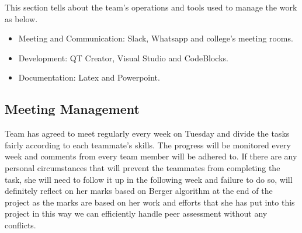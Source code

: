 \documentclass{article}
\begin{document}
This section tells about the team's operations and tools used to manage the work as below.   
\begin{itemize}

\item Meeting and Communication: Slack, Whatsapp and college's meeting rooms.
\item Development: QT Creator, Visual Studio and CodeBlocks.
\item Documentation: Latex and Powerpoint.

\end{itemize}


\subsection{Meeting Management} 
Team has agreed to meet regularly every week on Tuesday and divide the tasks fairly according to each teammate's skills. The progress will be monitored every week and comments from every team member will be adhered to. \newline If there are any personal circumstances that will prevent the teammates from completing the task, she will need to follow it up in the following week and failure to do so, will definitely reflect on her marks based on Berger algorithm at the end of the project as the marks are based on her work and efforts that she has put into this project in this way we can efficiently handle peer assessment without any conflicts. 
\end{document}
